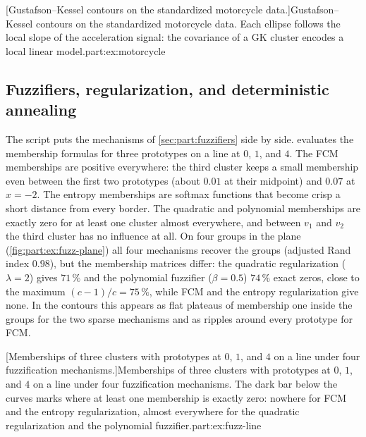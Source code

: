 [Gustafson--Kessel contours on the standardized motorcycle data.]{Gustafson--Kessel contours on the standardized motorcycle data. Each ellipse follows the local slope of the acceleration signal: the covariance of a GK cluster encodes a local linear model.}{part:ex:motorcycle}

\subsection{Fuzzifiers, regularization, and deterministic annealing}\label{sec:part:ex:fuzzifiers}

The script  puts the mechanisms of \cref{sec:part:fuzzifiers} side by side.  evaluates the membership formulas for three prototypes on a line at $0$, $1$, and $4$. The FCM memberships are positive everywhere: the third cluster keeps a small membership even between the first two prototypes (about $0.01$ at their midpoint) and $0.07$ at $x=-2$. The entropy memberships are softmax functions that become crisp a short distance from every border. The quadratic and polynomial memberships are exactly zero for at least one cluster almost everywhere, and between $v_1$ and $v_2$ the third cluster has no influence at all. On four groups in the plane (\cref{fig:part:ex:fuzz-plane}) all four mechanisms recover the groups (adjusted Rand index $0.98$), but the membership matrices differ: the quadratic regularization ($\lambda=2$) gives $71\,\%$ and the polynomial fuzzifier ($\beta=0.5$) $74\,\%$ exact zeros, close to the maximum $(c-1)/c=75\,\%$, while FCM and the entropy regularization give none. In the contours this appears as flat plateaus of membership one inside the groups for the two sparse mechanisms and as ripples around every prototype for FCM.

[Memberships of three clusters with prototypes at $0$, $1$, and $4$ on a line under four fuzzification mechanisms.]{Memberships of three clusters with prototypes at $0$, $1$, and $4$ on a line under four fuzzification mechanisms. The dark bar below the curves marks where at least one membership is exactly zero: nowhere for FCM and the entropy regularization, almost everywhere for the quadratic regularization and the polynomial fuzzifier.}{part:ex:fuzz-line}

